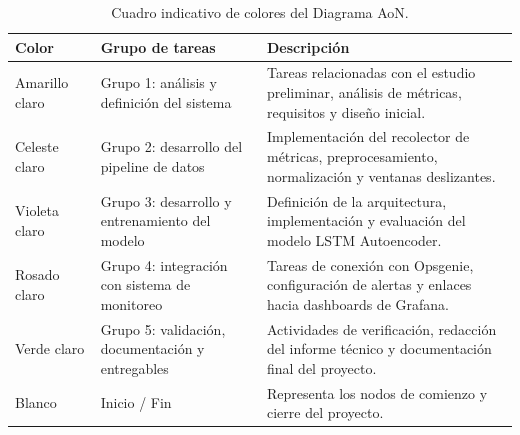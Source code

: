 \documentclass[
11pt, %
]{charter}
\begin{document}
\begin{table}[H]
\centering
\begin{tabular}{|>{\centering\arraybackslash}p{0.17\linewidth}|>{\raggedright\arraybackslash}p{0.33\linewidth}|>{\raggedright\arraybackslash}p{0.5\linewidth}|}
\hline
\rowcolor[HTML]{C0C0C0} \textbf{Color}& \textbf{Grupo de tareas} & \textbf{Descripción} \\ \hline

\cellcolor[HTML]{FFF2CC} Amarillo claro & Grupo 1: análisis y definición del sistema& Tareas relacionadas con el estudio preliminar, análisis de métricas, requisitos y diseño inicial. \\ \hline

\cellcolor[HTML]{DAE8FC} Celeste claro & Grupo 2: desarrollo del pipeline de datos& Implementación del recolector de métricas, preprocesamiento, normalización y ventanas deslizantes. \\ \hline

\cellcolor[HTML]{E1D5E7} Violeta claro & Grupo 3: desarrollo y entrenamiento del modelo& Definición de la arquitectura, implementación y evaluación del modelo LSTM Autoencoder. \\ \hline

\cellcolor[HTML]{F8CECC} Rosado claro & Grupo 4: integración con sistema de monitoreo& Tareas de conexión con Opsgenie, configuración de alertas y enlaces hacia dashboards de Grafana. \\ \hline

\cellcolor[HTML]{D5E8D4} Verde claro & Grupo 5: validación, documentación y entregables& Actividades de verificación, redacción del informe técnico y documentación final del proyecto. \\ \hline

\cellcolor[HTML]{FFFFFF} Blanco & Inicio / Fin & Representa los nodos de comienzo y cierre del proyecto. \\ \hline

\end{tabular}
\caption{Cuadro indicativo de colores del Diagrama AoN.}
\end{table}
\end{document}
